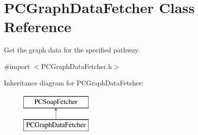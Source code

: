 \hypertarget{interface_p_c_graph_data_fetcher}{
\section{PCGraphDataFetcher Class Reference}
\label{interface_p_c_graph_data_fetcher}
}


Get the graph data for the specified pathway.  




{\ttfamily \#import $<$PCGraphDataFetcher.h$>$}

Inheritance diagram for PCGraphDataFetcher:\begin{figure}[h!]
\begin{center}
\leavevmode
\includegraphics[height=2.000000cm]{kegg_doc/interface_p_c_graph_data_fetcher}
\end{center}
\end{figure}
